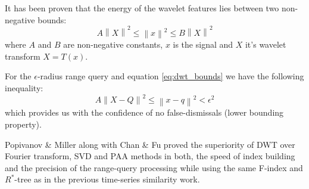 It has been proven \cite{citeulike:499150} that the energy of the wavelet features lies between two non-negative bounds:
\begin{equation}
A \left\| X \right\|^{2} \leq \left\| x \right\|^{2} \leq B \left\| X \right\|^{2}
\label{eq:dwt_bounds}
\end{equation}
where $A$ and $B$ are non-negative constants, $x$ is the signal and $X$ it's wavelet transform $X=T(x)$. 

For the $\epsilon$-radius range query and equation \ref{eq:dwt_bounds} we have the following inequality:
\begin{equation}
A \left\| X-Q \right\|^{2} \leq \left\| x-q \right\|^{2} < \epsilon^{2} 
\label{eq:}
\end{equation}
which provides us with the confidence of no false-dismissals (lower bounding property).

Popivanov \& Miller along with Chan \& Fu \cite{citeulike:4384535} proved the superiority of DWT over Fourier transform, SVD and PAA methods in both, the speed of index building and the precision of the range-query processing while using the same F-index and $R^{*}$-tree as in the previous time-series similarity work.  